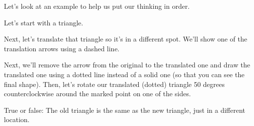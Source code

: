 \documentclass{ximera}
\begin{document}
Let's look at an example to help us put our thinking in order.
\begin{example}
Let's start with a triangle.
\begin{image}\end{image}
Next, let's translate that triangle so it's in a different spot. We'll show one of the translation arrows using a dashed line.
\begin{image}\end{image}
Next, we'll remove the arrow from the original to the translated one and draw the translated one using a dotted line instead of a solid one (so that you can see the final shape). Then, let's rotate our translated (dotted) triangle 50 degrees counterclockwise around the marked point on one of the sides.
\begin{image}\end{image}


\begin{question}
True or false: The old triangle is the same as the new triangle, just in a different location.
\begin{multipleChoice}
\end{multipleChoice}
\end{question}


\end{example}
\end{document}
